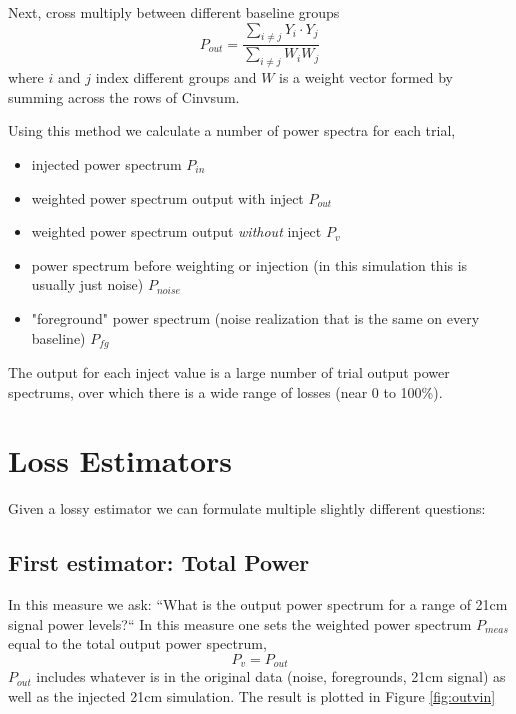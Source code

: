 \documentclass{article}
\begin{document}
Next, cross multiply between different baseline groups
\begin{equation}
P_{out} = \frac{\sum_{i\neq j} Y_i \cdot Y_j }{\sum_{i\neq j} W_i W_j}
\end{equation}
where $i$ and $j$ index different groups and $W$ is a weight vector formed by summing across the rows of Cinvsum.


Using this method we calculate a number of power spectra for each trial,
\begin{itemize}
\item injected power spectrum $P_{in}$
\item weighted power spectrum output with inject $P_{out}$ 
\item weighted power spectrum output \emph{without} inject $P_{v}$
\item power spectrum before weighting or injection (in this simulation this is usually just noise) $P_{noise}$
\item "foreground" power spectrum (noise realization that is the same on every baseline) $P_{fg}$
\end{itemize}

The output for each inject value is a large number of trial output power spectrums, over which there is a wide range of losses (near 0 to 100\%).  

\section*{Loss Estimators}

Given a lossy estimator we can formulate multiple slightly different questions:
\subsection*{First estimator: Total Power} 
In this measure we ask: ``What is the output power spectrum for a range of 21cm signal power levels?`` In this measure one sets the weighted power spectrum $P_{meas}$ equal to the total output power spectrum,
\begin{equation}
P_{v} = P_{out} 
\end{equation}
$P_{out}$ includes whatever is in the original data (noise, foregrounds, 21cm signal) as well as the injected 21cm simulation.  The result is plotted in Figure \ref{fig:outvin}
\end{document}
